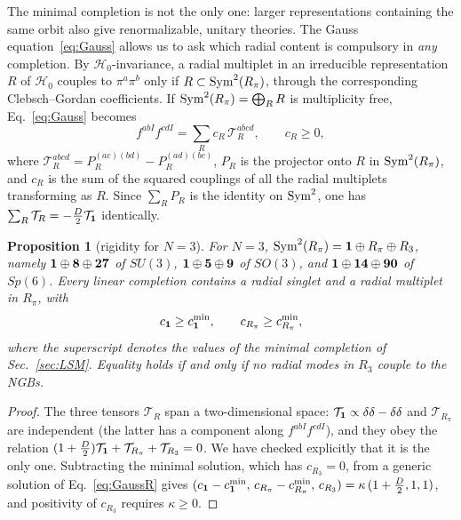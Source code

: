 \documentclass[aps,prd,twocolumn,superscriptaddress,nofootinbib,floatfix]{revtex4-2}
\newtheorem{proposition}{Proposition}
\theoremstyle{remark}
\newcommand{\Hg}{\mathcal{H}_0}    %
\begin{document}
The minimal completion is not the only one: larger representations containing the same orbit also give renormalizable, unitary theories. The Gauss equation~\eqref{eq:Gauss} allows us to ask which radial content is compulsory in \emph{any} completion. By $\Hg$-invariance, a radial multiplet in an irreducible representation $R$ of $\Hg$ couples to $\pi^a\pi^b$ only if $R\subset{\rm Sym}^2(R_\pi)$, through the corresponding Clebsch--Gordan coefficients. If ${\rm Sym}^2(R_\pi)=\bigoplus_RR$ is multiplicity free, Eq.~\eqref{eq:Gauss} becomes
\begin{equation}
f^{abI}f^{cdI}=\sum_{R}c_R\,\mathcal{T}_R^{abcd},\qquad c_R\ge0,
\label{eq:GaussR}
\end{equation}
where $\mathcal{T}_R^{abcd}=P_R^{(ac)(bd)}-P_R^{(ad)(bc)}$, $P_R$ is the projector onto $R$ in ${\rm Sym}^2(R_\pi)$, and $c_R$ is the sum of the squared couplings of all the radial multiplets transforming as $R$. Since $\sum_RP_R$ is the identity on ${\rm Sym}^2$, one has $\sum_R\mathcal{T}_R=-\frac{D}{2}\mathcal{T}_{\bf 1}$ identically.

\begin{proposition}[rigidity for $N=3$]
\label{prop:rigidity}
For $N=3$, ${\rm Sym}^2(R_\pi)={\bf 1}\oplus R_\pi\oplus R_3$, namely ${\bf 1}\oplus{\bf 8}\oplus{\bf 27}$ of $SU(3)$, ${\bf 1}\oplus{\bf 5}\oplus{\bf 9}$ of $SO(3)$, and ${\bf 1}\oplus{\bf 14}\oplus{\bf 90}$ of $Sp(6)$. Every linear completion contains a radial singlet and a radial multiplet in $R_\pi$, with
\begin{equation}
c_{\bf 1}\ge c_{\bf 1}^{\rm min},\qquad c_{R_\pi}\ge c_{R_\pi}^{\rm min},
\label{eq:rigidity}
\end{equation}
where the superscript denotes the values of the minimal completion of Sec.~\ref{sec:LSM}. Equality holds if and only if no radial modes in $R_3$ couple to the NGBs.
\end{proposition}
\begin{proof}
The three tensors $\mathcal{T}_R$ span a two-dimensional space: $\mathcal{T}_{\bf 1}\propto\delta\delta-\delta\delta$ and $\mathcal{T}_{R_\pi}$ are independent (the latter has a component along $f^{abI}f^{cdI}$), and they obey the relation $(1+\frac D2)\mathcal{T}_{\bf 1}+\mathcal{T}_{R_\pi}+\mathcal{T}_{R_3}=0$. We have checked explicitly that it is the only one. Subtracting the minimal solution, which has $c_{R_3}=0$, from a generic solution of Eq.~\eqref{eq:GaussR} gives $(c_{\bf 1}-c^{\rm min}_{\bf 1},\,c_{R_\pi}-c^{\rm min}_{R_\pi},\,c_{R_3})=\kappa\,(1+\tfrac D2,1,1)$, and positivity of $c_{R_3}$ requires $\kappa\ge0$.
\end{proof}
\end{document}

